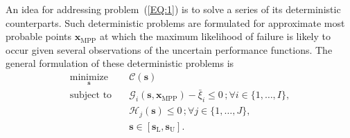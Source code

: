 \documentclass[preprint,3p]{elsarticle}
\begin{document}
\begin{linenumbers}
An idea for addressing problem~(\ref{EQ:1}) is to solve a series of its deterministic counterparts.
Such deterministic problems are formulated for approximate most probable points $\textbf{x}_\text{MPP}$ at which the maximum likelihood of failure is likely to occur given several observations of the uncertain performance functions.
The general formulation of these deterministic problems is  
\begin{equation}
	\begin{aligned}
		\underset{\textbf{s}}{\text{minimize}} \quad & \mathcal{C}(\textbf{s})\\
		\text{subject to} \quad &
		\mathcal{G}_i(\textbf{s},\textbf{x}_\text{MPP})-\bar{\xi}_i \leq 0 \,; \forall i \in \{1,\dots,I\},\\
		& \mathcal{H}_j(\textbf{s}) \leq 0 \,; \forall j \in \{1,\dots,J\},\\
		&\textbf{s} \in [\textbf{s}_\text{L},\textbf{s}_\text{U}].
	\end{aligned}
	\label{EQ:1B}
\end{equation}


\end{linenumbers}
\end{document}
